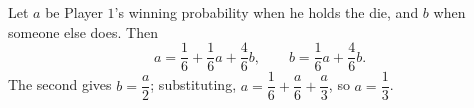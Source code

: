 Let $a$ be Player $1$'s winning probability when he holds the die, and $b$ when someone else does. Then
\[a=\dfrac16+\dfrac16a+\dfrac46b,\qquad b=\dfrac16a+\dfrac46b.\]
The second gives $b=\dfrac a2$; substituting, $a=\dfrac16+\dfrac a6+\dfrac a3$, so $a=\boxed{\dfrac13}$.
